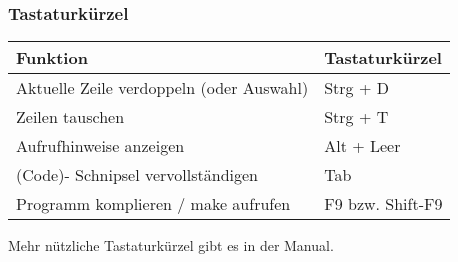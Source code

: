 \begin{frame}
	\frametitle{Tastaturkürzel}
	\begin{block}{}
		\centering
		\begin{table}[h!]
			\begin{tabular}{ll}
				\textbf{Funktion} & \textbf{Tastaturkürzel} \\ \hline
				Aktuelle Zeile verdoppeln (oder Auswahl) & Strg + D \\
				Zeilen tauschen & Strg + T \\
				Aufrufhinweise anzeigen & Alt + Leer \\
				(Code)- Schnipsel vervollständigen & Tab \\
				Programm komplieren / make aufrufen & F9 bzw. Shift-F9
			\end{tabular}
		\end{table}
	\end{block}
\pause
Mehr nützliche Tastaturkürzel gibt es in der Manual.
\end{frame}
